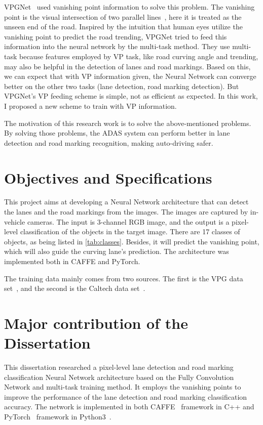 \begin{spacing}{1.5}
VPGNet~\cite{lee2017vpgnet} used vanishing point information to solve this problem. The vanishing point is the visual intersection of two parallel lines~\cite{barnard1983interpreting}, here it is treated as the unseen end of the road.  Inspired by the intuition that human eyes utilize the vanishing point to predict the road trending, VPGNet tried to feed this information into the neural network by the multi-task method. They use multi-task because features employed by VP task, like road curving angle and trending, may also be helpful in the detection of lanes and road markings. Based on this, we can expect that with VP information given, the Neural Network can converge better on the other two tasks (lane detection, road marking detection). But VPGNet’s VP feeding scheme is simple, not as efficient as expected. In this work, I proposed a new scheme to train with VP information.

The motivation of this research work is to solve the above-mentioned problems. By solving those problems, the ADAS system can perform better in lane detection and road marking recognition, making auto-driving safer.

\section{Objectives and Specifications}
\label{sec:IN_objectives}

This project aims at developing a Neural Network architecture that can detect the lanes and the road markings from the images. The images are captured by in-vehicle cameras. The input is 3-channel RGB image, and the output is a pixel-level classification of the objects in the target image. There are 17 classes of objects, as being listed in \autoref{tab:classes}. Besides, it will predict the vanishing point, which will also guide the curving lane's prediction. The architecture was implemented both in CAFFE and PyTorch.

The training data mainly comes from two sources. The first is the VPG data set~\cite{lee2017vpgnet}, and the second is the Caltech data set~\cite{aly2008real}.

\section{Major contribution of the Dissertation}
\label{sec:IN_contribution}

This dissertation researched a pixel-level lane detection and road marking classification Neural Network architecture based on the Fully Convolution Network and multi-task training method. It employs the vanishing points to improve the performance of the lane detection and road marking classification accuracy. The network is implemented in both CAFFE~\cite{jia2014caffe} framework in C++ and PyTorch~\cite{NEURIPS2019_9015} framework in Python3~\cite{python3}.


\end{spacing}
